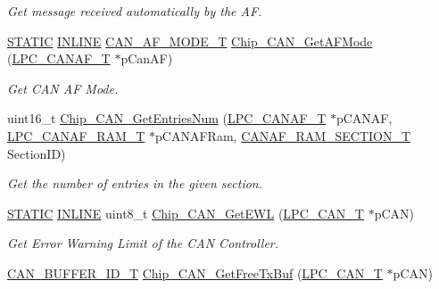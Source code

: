 \begin{DoxyCompactItemize}
\begin{DoxyCompactList}\small\item\em Get message received automatically by the AF. \end{DoxyCompactList}\item 
\hyperlink{group__LPC__Types__Public__Macros_ga10b2d890d871e1489bb02b7e70d9bdfb}{S\+T\+A\+T\+IC} \hyperlink{group__LPC__Types__Public__Types_ga2eb6f9e0395b47b8d5e3eeae4fe0c116}{I\+N\+L\+I\+NE} \hyperlink{group__CAN__17XX__40XX_gaf9abd01ef9ba38a2113a240871e9b48a}{C\+A\+N\+\_\+\+A\+F\+\_\+\+M\+O\+D\+E\+\_\+T} \hyperlink{group__CAN__17XX__40XX_ga7f33c4f2edcfc126ad4d55ac86b2ad23}{Chip\+\_\+\+C\+A\+N\+\_\+\+Get\+A\+F\+Mode} (\hyperlink{structLPC__CANAF__T}{L\+P\+C\+\_\+\+C\+A\+N\+A\+F\+\_\+T} $\ast$p\+Can\+AF)
\begin{DoxyCompactList}\small\item\em Get C\+AN AF Mode. \end{DoxyCompactList}\item 
uint16\+\_\+t \hyperlink{group__CAN__17XX__40XX_gabf7932e8e5dfd4b8efcd17b1900c53b6}{Chip\+\_\+\+C\+A\+N\+\_\+\+Get\+Entries\+Num} (\hyperlink{structLPC__CANAF__T}{L\+P\+C\+\_\+\+C\+A\+N\+A\+F\+\_\+T} $\ast$p\+C\+A\+N\+AF, \hyperlink{structLPC__CANAF__RAM__T}{L\+P\+C\+\_\+\+C\+A\+N\+A\+F\+\_\+\+R\+A\+M\+\_\+T} $\ast$p\+C\+A\+N\+A\+F\+Ram, \hyperlink{group__CAN__17XX__40XX_gaf0ae33e71a7acfc561972811aa1207e8}{C\+A\+N\+A\+F\+\_\+\+R\+A\+M\+\_\+\+S\+E\+C\+T\+I\+O\+N\+\_\+T} Section\+ID)
\begin{DoxyCompactList}\small\item\em Get the number of entries in the given section. \end{DoxyCompactList}\item 
\hyperlink{group__LPC__Types__Public__Macros_ga10b2d890d871e1489bb02b7e70d9bdfb}{S\+T\+A\+T\+IC} \hyperlink{group__LPC__Types__Public__Types_ga2eb6f9e0395b47b8d5e3eeae4fe0c116}{I\+N\+L\+I\+NE} uint8\+\_\+t \hyperlink{group__CAN__17XX__40XX_ga7a4f26336007dc7ebba7163ed449e384}{Chip\+\_\+\+C\+A\+N\+\_\+\+Get\+E\+WL} (\hyperlink{structLPC__CAN__T}{L\+P\+C\+\_\+\+C\+A\+N\+\_\+T} $\ast$p\+C\+AN)
\begin{DoxyCompactList}\small\item\em Get Error Warning Limit of the C\+AN Controller. \end{DoxyCompactList}\item 
\hyperlink{group__CAN__17XX__40XX_ga073d4792bdf9dd0d8ceda6b8c3752dd9}{C\+A\+N\+\_\+\+B\+U\+F\+F\+E\+R\+\_\+\+I\+D\+\_\+T} \hyperlink{group__CAN__17XX__40XX_gadb33450a707ebe03be084c2783017272}{Chip\+\_\+\+C\+A\+N\+\_\+\+Get\+Free\+Tx\+Buf} (\hyperlink{structLPC__CAN__T}{L\+P\+C\+\_\+\+C\+A\+N\+\_\+T} $\ast$p\+C\+AN)

\end{DoxyCompactItemize}
